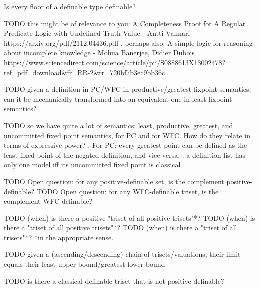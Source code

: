\documentclass[oneside,12pt]{book}
\newcounter{question}
\theoremstyle{definition}
\theoremstyle{remark}
\begin{document}
Is every floor of a definable type definable?

TODO this might be of relevance to you:
A Completeness Proof for A Regular Predicate Logic with Undefined Truth Value - Antti Valmari
https://arxiv.org/pdf/2112.04436.pdf
.
perhaps also:
A simple logic for reasoning about incomplete knowledge - Mohua Banerjee, Didier Dubois
https://www.sciencedirect.com/science/article/pii/S0888613X13002478?ref=pdf_download&fr=RR-2&rr=720bf7b3ec9bb36c

TODO given a definition in PC/WFC in productive/greatest fixpoint semantics,
can it be mechanically transformed into an equivalent one in least fixpoint semantics?

TODO so we have quite a lot of semantics: least, productive, greatest, and uncommitted
fixed point semantics, for PC and for WFC. How do they relate in terms of expressive power?
.
For PC: every greatest point can be defined as the least fixed point of the negated
definition, and vice versa.
.
a definition list has only one model iff its uncommitted fixed point is classical

TODO Open question: for any positive-definable set, is the complement positive-definable?
TODO Open question: for any WFC-definable triset, is the complement WFC-definable?

TODO (when) is there a positive "triset of all positive trisets"*?
TODO (when) is there a "triset of all positive trisets"*?
TODO (when) is there a "triset of all trisets"*?
*in the appropriate sense.

TODO given a (ascending/descending) chain of trisets/valuations, their limit equals
their least upper bound/greatest lower bound

TODO is there a classical definable triset that is not positive-definable?
\end{document}
